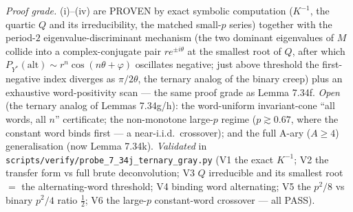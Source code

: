 \documentclass[
]{article}
\begin{document}
\emph{Proof grade.} (i)--(iv) are PROVEN by exact symbolic computation ($K^{-1}$,
the quartic $Q$ and its irreducibility, the matched small-$p$ series) together
with the period-$2$ eigenvalue-discriminant mechanism (the two dominant
eigenvalues of $M$ collide into a complex-conjugate pair $re^{\pm i\theta}$ at
the smallest root of $Q$, after which $P_{Y^*}(\mathrm{alt})\sim r^n\cos(n\theta
+\varphi)$ oscillates negative; just above threshold the first-negative index
diverges as $\pi/2\theta$, the ternary analog of the binary creep) plus an
exhaustive word-positivity scan --- the same proof grade as Lemma 7.34f.
\emph{Open} (the ternary analog of Lemmas 7.34g/h): the word-uniform
invariant-cone ``all words, all $n$'' certificate; the non-monotone large-$p$
regime ($p\gtrsim0.67$, where the constant word binds first --- a near-i.i.d.\
crossover); and the full A-ary ($A\ge4$) generalisation (now Lemma 7.34k).
\emph{Validated} in
\texttt{scripts/verify/probe\_7\_34j\_ternary\_gray.py} (V1 the exact $K^{-1}$;
V2 the transfer form vs full brute deconvolution; V3 $Q$ irreducible and its
smallest root $=$ the alternating-word threshold; V4 binding word alternating;
V5 the $p^2/8$ vs binary $p^2/4$ ratio $\tfrac12$; V6 the large-$p$
constant-word crossover --- all PASS).
\end{document}
